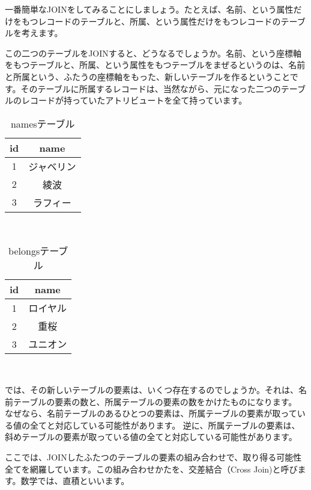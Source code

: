 一番簡単なJOINをしてみることにしましょう。たとえば、名前、という属性だけをもつレコードのテーブルと、所属、という属性だけをもつレコードのテーブルを考えます。

この二つのテーブルをJOINすると、どうなるでしょうか。名前、という座標軸をもつテーブルと、所属、という属性をもつテーブルをまぜるというのは、名前と所属という、ふたうの座標軸をもった、新しいテーブルを作るということです。そのテーブルに所属するレコードは、当然ながら、元になった二つのテーブルのレコードが持っていたアトリビュートを全て持っています。

\begin{table}[htb]
  \begin{tabular}{|c|c|} \hline
    id & name \\ \hline
    1 & ジャベリン \\
    2 & 綾波 \\
    3 & ラフィー \\ \hline
  \end{tabular}
　　\label{table:names}
　　\caption{namesテーブル}
\end{table}

\begin{table}[htb]
  \begin{tabular}{|c|c|} \hline
    id & name \\ \hline
    1 & ロイヤル \\
    2 & 重桜 \\
    3 & ユニオン \\ \hline
  \end{tabular}
　　\label{table:belongs}
　　\caption{belongsテーブル}
\end{table}

では、その新しいテーブルの要素は、いくつ存在するのでしょうか。それは、名前テーブルの要素の数と、所属テーブルの要素の数をかけたものになります。
なぜなら、名前テーブルのあるひとつの要素は、所属テーブルの要素が取っている値の全てと対応している可能性があります。
逆に、所属テーブルの要素は、斜めテーブルの要素が取っている値の全てと対応している可能性があります。

ここでは、JOINしたふたつのテーブルの要素の組み合わせで、取り得る可能性全てを網羅しています。この組み合わせかたを、交差結合（Cross Join)と呼びます。数学では、直積といいます。


